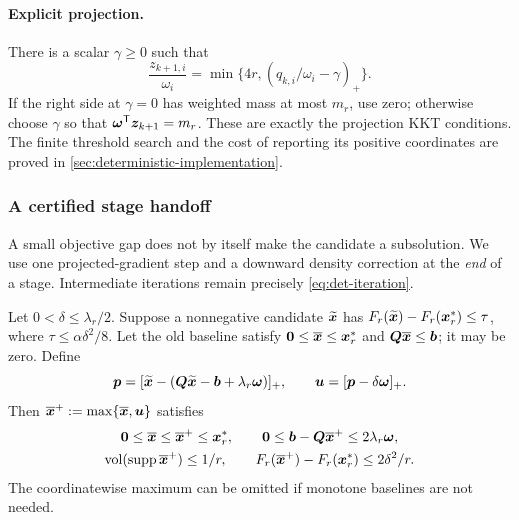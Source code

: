\paragraph{Explicit projection.}
There is a scalar $\gamma\geq0$ such that
\begin{equation}
 \frac{z_{k+1,i}}{\omega_i}
 =\min\{4r,(q_{k,i}/\omega_i-\gamma)_+\}.
 \label{eq:det-waterfill}
\end{equation}
If the right side at $\gamma=0$ has weighted mass at most $m_r$, use zero;
otherwise choose $\gamma$ so that $\bm{\omega}^{\mathsf{T}}\bm{z}_{k+1}=m_r$.
These are exactly the projection KKT conditions. The finite threshold search
and the cost of reporting its positive coordinates are proved in
\cref{sec:deterministic-implementation}.

\subsubsection{A certified stage handoff}

A small objective gap does not by itself make the candidate a subsolution.
We use one projected-gradient step and a downward density correction at the
\emph{end} of a stage. Intermediate iterations remain precisely
\cref{eq:det-iteration}.

\begin{lemma}
\label{lem:det-repair}
Let $0<\delta\leq\lambda_r/2$. Suppose a nonnegative candidate
$\widetilde{\bm{x}}$ has $F_r(\widetilde{\bm{x}})-F_r(\bm{x}_r^*)\leq\tau$, where
$\tau\leq\alpha\delta^2/8$. Let the old baseline satisfy
$\bm{0}\leq\overline{\bm{x}}\leq\bm{x}_r^*$ and
$\bm{Q}\overline{\bm{x}}\leq\bm{b}$; it may be zero. Define
\begin{equation}
 \bm{p}=[\widetilde{\bm{x}}-(\bm{Q}\widetilde{\bm{x}}-\bm{b}+\lambda_r\bm{\omega})]_+,
 \qquad \bm{u}=[\bm{p}-\delta\bm{\omega}]_+.
 \label{eq:det-repair-map}
\end{equation}
Then $\overline{\bm{x}}^+:=\max\{\overline{\bm{x}},\bm{u}\}$ satisfies
\begin{equation}
 \begin{gathered}
 \bm{0}\leq\overline{\bm{x}}\leq\overline{\bm{x}}^+\leq\bm{x}_r^*,\qquad
 \bm{0}\leq\bm{b}-\bm{Q}\overline{\bm{x}}^+\leq2\lambda_r\bm{\omega},\\
 \operatorname{vol}(\operatorname{supp}\overline{\bm{x}}^+)\leq1/r,\qquad
 F_r(\overline{\bm{x}}^+)-F_r(\bm{x}_r^*)\leq2\delta^2/r.
 \end{gathered}
 \label{eq:det-repaired-invariant}
\end{equation}
The coordinatewise maximum can be omitted if monotone baselines are not
needed.
\end{lemma}


